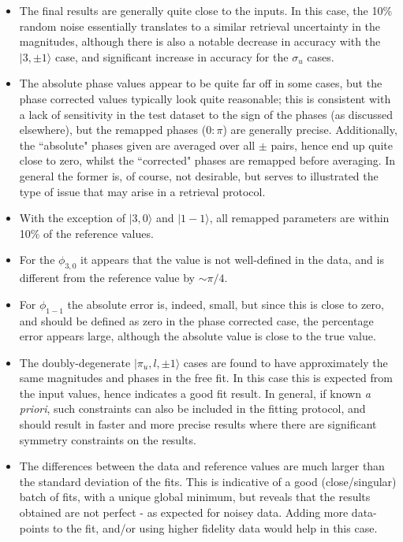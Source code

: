 \documentclass[10pt]{article}
\begin{document}
\begin{itemize}
\item The final results are generally quite close to the inputs. In this case, the 10\% random noise essentially translates to a similar retrieval uncertainty in the magnitudes, although there is also a notable decrease in accuracy with the $|3,\pm1\rangle$ case, and significant increase in accuracy for the $\sigma_u$ cases.
\item The absolute phase values appear to be quite far off in some cases, but the phase corrected values typically look quite reasonable; this is consistent with a lack of sensitivity in the test dataset to the sign of the phases (as discussed elsewhere), but the remapped phases ($0:\pi$) are generally precise. Additionally, the ``absolute" phases given are averaged over all $\pm$ pairs, hence end up quite close to zero, whilst the ``corrected" phases are remapped before averaging. In general the former is, of course, not desirable, but serves to illustrated the type of issue that may arise in a retrieval protocol.
\item With the exception of $|3,0\rangle$ and $|1-1\rangle$, all remapped parameters are within 10\% of the reference values.
\item For the $\phi_{3,0}$ it appears that the value is not well-defined in the data, and is different from the reference value by $\sim\pi/4$.
\item For $\phi_{1-1}$ the absolute error is, indeed, small, but since this is close to zero, and should be defined as zero in the phase corrected case, the percentage error appears large, although the absolute value is close to the true value.
\item The doubly-degenerate $|\pi_u,l,\pm1\rangle$ cases are found to have approximately the same magnitudes and phases in the free fit. In this case this is expected from the input values, hence indicates a good fit result. In general, if known \textit{a priori}, such constraints can also be included in the fitting protocol, and should result in faster and more precise results where there are significant symmetry constraints on the results.
\item The differences between the data and reference values are much larger than the standard deviation of the fits. This is indicative of a good (close/singular) batch of fits, with a unique global minimum, but reveals that the results obtained are not perfect - as expected for noisey data. Adding more data-points to the fit, and/or using higher fidelity data would help in this case.

\end{itemize}
\end{document}
